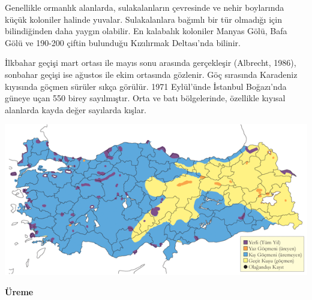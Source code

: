 \documentclass[
  a4paper,
  DIV=11,
  numbers=noendperiod]{scrreprt}
\begin{document}
Genellikle ormanlık alanlarda, sulakalanların çevresinde ve nehir
boylarında küçük koloniler halinde yuvalar. Sulakalanlara bağımlı bir
tür olmadığı için bilindiğinden daha yaygın olabilir. En kalabalık
koloniler Manyas Gölü, Bafa Gölü ve 190-200 çiftin bulunduğu Kızılırmak
Deltası'nda bilinir.

İlkbahar geçişi mart ortası ile mayıs sonu arasında gerçekleşir
(Albrecht, 1986), sonbahar geçişi ise ağustos ile ekim ortasında
gözlenir. Göç sırasında Karadeniz kıyısında göçmen sürüler sıkça
görülür. 1971 Eylül'ünde İstanbul Boğazı'nda güneye uçan 550 birey
sayılmıştır. Orta ve batı bölgelerinde, özellikle kıyısal alanlarda
kayda değer sayılarda kışlar.

\includegraphics{images/harita_Page_069.png}

\textbf{Üreme}
\end{document}
